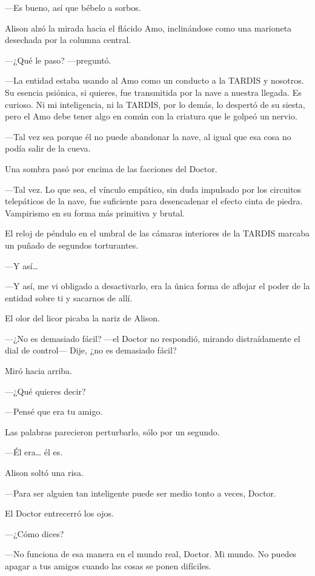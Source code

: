 {---Es bueno, así que bébelo a sorbos.}

{Alison alzó la mirada hacia el flácido Amo, inclinándose como una
marioneta desechada por la columna central.}

{---¿Qué le paso? ---preguntó.}

{---La entidad estaba usando al Amo como un conducto a la TARDIS y
 nosotros. Su esencia psiónica, si quieres, fue transmitida por la nave a
 nuestra llegada. Es curioso. Ni mi inteligencia, ni la TARDIS, por lo
 demás, lo despertó de su siesta, pero el Amo debe tener algo en común
con la criatura que le golpeó un nervio.}

{---Tal vez sea porque él no puede abandonar la nave, al igual que esa
cosa no podía salir de la cueva.}

{Una sombra pasó por encima de las facciones del Doctor.}

{---Tal vez. Lo que sea, el vínculo empático, sin duda impulsado por los
 circuitos telepáticos de la nave, fue suficiente para desencadenar el
efecto cinta de piedra. Vampirismo en su forma más primitiva y brutal.}

{El reloj de péndulo en el umbral de las cámaras interiores de la TARDIS
marcaba un puñado de segundos torturantes.}

{---Y así\ldots{}}

{---Y así, me vi obligado a desactivarlo, era la única forma de aflojar
el poder de la entidad sobre ti y sacarnos de allí.}

{El olor del licor picaba la nariz de Alison.}

{---¿No es demasiado fácil? ---el Doctor no respondió, mirando
distraídamente el dial de control--- Dije, ¿no es demasiado fácil?}

{Miró hacia arriba.}

{---¿Qué quieres decir?}

{---Pensé que era tu amigo.}

{Las palabras parecieron perturbarlo, sólo por un segundo.}

{---Él era\ldots{} él es.}

{Alison soltó una risa.}

{---Para ser alguien tan inteligente puede ser medio tonto a veces,
Doctor.}

{El Doctor entrecerró los ojos.}

{---¿Cómo dices?}

{---No funciona de esa manera en el mundo real, Doctor. Mi mundo. No
puedes apagar a tus amigos cuando las cosas se ponen difíciles.}

